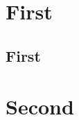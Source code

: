 \documentclass{article}
\begin{document}
{}

\section{First}

\subsection{First}

\section{Second}
\end{document}
